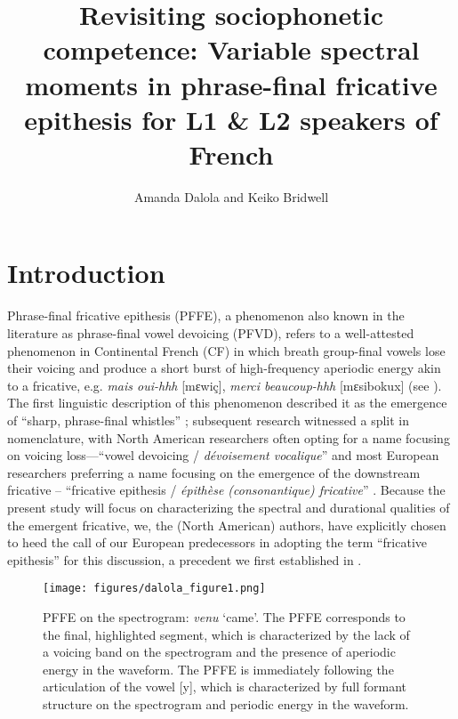 \documentclass[output=paper,colorlinks,citecolor=brown,draftmode]{langscibook}
\author{Amanda Dalola\orcid{0000-0002-0010-282X}\affiliation{University of Minnesota} and  Keiko Bridwell\orcid{0000-0002-9088-0544}\affiliation{University of Georgia}}
\title{Revisiting sociophonetic competence: Variable spectral moments in phrase-final fricative epithesis for L1 \& L2 speakers of French}
\begin{document}
\maketitle

\section{Introduction}
Phrase-final fricative epithesis (PFFE), a phenomenon also known in the literature as phrase-final vowel devoicing (PFVD), refers to a well-attested phenomenon in Continental French (CF) in which breath group-final vowels lose their voicing and produce a short burst of high-frequency aperiodic energy akin to a fricative, e.g. \emph{mais oui-hhh} [mεwiç], \emph{merci beaucoup-hhh} [mε\textinvscr sibokux] (see ). The first linguistic description of this phenomenon described it as the emergence of “sharp, phrase-final whistles” \citep{fonagy1989franccais}; subsequent research witnessed a split in nomenclature, with North American researchers often opting for a name focusing on voicing loss—“vowel devoicing / \emph{dévoisement vocalique}” \citep{fagyal1999sound,smith2002prosodic,smith2003vowel, smith2006and, martin2004devoisement} and most European researchers preferring a name focusing on the emergence of the downstream fricative -- “fricative epithesis / \emph{\'epith\`ese (consonantique) fricative}” \citep{fagyal2010accents, candea2012journal, candea2013recent}. Because the present study will focus on characterizing the spectral and durational qualities of the emergent fricative, we, the (North American) authors, have explicitly chosen to heed the call of our European predecessors in adopting the term “fricative epithesis” for this discussion, a precedent we first established in  \citet{dalola2020redefining}.

\begin{figure}
    \centering
    \texttt{[image: figures/dalola\_figure1.png]}
    \caption{PFFE on the spectrogram: \emph{venu} ‘came’. The PFFE corresponds to the final, highlighted segment, which is characterized by the lack of a voicing band on the spectrogram and the presence of aperiodic energy in the waveform. The PFFE is immediately following the articulation of the vowel [y], which is characterized by full formant structure on the spectrogram and periodic energy in the waveform.}
    \label{figure1}
\end{figure}
\end{document}
